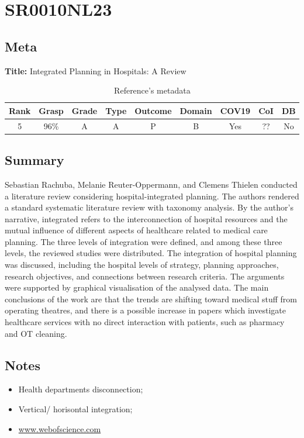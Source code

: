 \section{ SR0010NL23 }


\subsection{Meta}

    \textbf{Title:}
    Integrated Planning in Hospitals: A Review

    \begin{table}[H]
        \centering
        \begin{tabular}{|c|c|c|c|c|c|c|c|c|}
            \hline
                \textbf{Rank} & \textbf{Grasp} & \textbf{Grade} & \textbf{Type} & \textbf{Outcome} & \textbf{Domain} & \textbf{COV19} & \textbf{CoI} & \textbf{DB} \\
            \hline
                5 & 96\% & A & A & P & B & Yes & ?? & No \\
            \hline
        \end{tabular}
        \caption{Reference's metadata}
        \label{tab:SR0010NL23}
    \end{table}

\subsection{Summary}
    Sebastian Rachuba, Melanie Reuter-Oppermann, and Clemens Thielen conducted a literature review considering hospital-integrated planning. The authors rendered a standard systematic literature review with taxonomy analysis. By the author's narrative, integrated refers to the interconnection of hospital resources and the mutual influence of different aspects of healthcare related to medical care planning. The three levels of integration were defined, and among these three levels, the reviewed studies were distributed. The integration of hospital planning was discussed, including the hospital levels of strategy, planning approaches, research objectives, and connections between research criteria. The arguments were supported by graphical visualisation of the analysed data. The main conclusions of the work are that the trends are shifting toward medical stuff from operating theatres, and there is a possible increase in papers which investigate healthcare services with no direct interaction with patients, such as pharmacy and OT cleaning. 
    

\subsection{Notes}
    \begin{itemize}
        \item Health departments disconnection;
        \item Vertical/ horisontal integration;
        \item \url{www.webofscience.com}
    \end{itemize}


